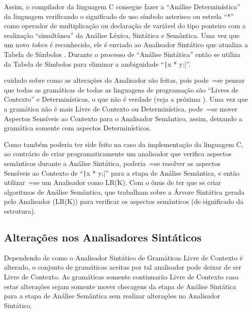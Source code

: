 Assim,
o compilador da linguagem C consegue fazer a ``Análise Determinística'' da linguagem verificando o significado de uso símbolo asterisco ou
estrela ``*'' como operador de multiplicação ou
declaração de variável do tipo ponteiro com a realização ``simultânea'' da Análise Léxica,
Sintática e
Semântica.
Uma vez que um novo \textit{token} é reconhecido,
ele é enviado ao Analisador Sintático que atualiza a Tabela de Símbolos \cite{ahoCompilerDragonBook}.
Durante o processo de ``Análise Sintática'' então se utiliza da Tabela de Símbolos para eliminar a ambiguidade ``\texttt|x * y;|''.

 cuidado sobre como as alterações do Analisador são feitas,
pois pode~=se pensar que todas as gramáticas de todas as linguagens de programação são ``Livres de Contexto'' e
Determinísticas,
o que não é verdade (veja a próxima ).
Uma vez que a gramática não é mais Livre de Contexto ou
Determinística,
pode~=se mover Aspectos Sensíveis ao Contexto para o Analisador Semântico,
assim,
deixando a gramática somente com aspectos Determinísticos.

Como também poderia ter side feito na caso da implementação da linguagem C,
ao contrário de criar programaticamente um analisador que verifica aspectos semânticos durante a Análise Sintática,
poderia~=se resolver os aspectos Sensíveis ao Contexto de ``\texttt|x * y;|'' para a etapa de Análise Semântica,
e então utilizar~=se um Analisador como LR(K).
Com o ônus de ter que se criar algoritmos de Análise Semântica,
que trabalham sobre a Árvore Sintática gerada pelo Analisador (LR(K)) para verificar os aspectos semânticos (de significado da estrutura).


\subsection{Alterações nos Analisadores Sintáticos}
\label{section:alteracoesNosAnalisadoresSintaticos}

Dependendo de como o Analisador Sintático de Gramáticas Livre de Contexto é alterado,
o conjunto de gramáticas aceitas por tal analisador pode deixar de ser Livre de Contexto.
As gramáticas somente continuarão Livre de Contexto caso estas alterações sejam somente mover checagens da etapa de Análise Sintática para a etapa de Análise Semântica sem realizar alterações no Analisador Sintático.

